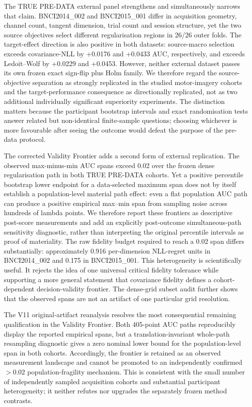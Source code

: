 The TRUE PRE-DATA external panel strengthens and simultaneously narrows that
claim. BNCI2014\_002 and BNCI2015\_001 differ in acquisition geometry,
channel count, tangent dimension, trial count and session structure, yet the
two source objectives select different regularisation regions in 26/26 outer
folds. The target-effect direction is also positive in both datasets:
source-macro selection exceeds covariance-NLL by +0.0176 and +0.0433 AUC,
respectively, and exceeds Ledoit--Wolf by +0.0229 and +0.0453. However,
neither external dataset passes its own frozen exact sign-flip plus Holm
family. We therefore regard the source-objective separation as strongly
replicated in the studied motor-imagery cohorts and the target-performance
consequence as directionally replicated, not as two additional individually
significant superiority experiments. The distinction matters because the
participant bootstrap intervals and exact randomisation tests answer related
but non-identical finite-sample questions; choosing whichever is more
favourable after seeing the outcome would defeat the purpose of the pre-data
protocol.

The corrected Validity Frontier adds a second form of external replication.
The observed max-minus-min AUC spans exceed 0.02 over the frozen dense
regularisation path in both TRUE PRE-DATA cohorts. Yet a positive percentile
bootstrap lower endpoint for a data-selected maximum span does not by itself
establish a population-level material path effect: even a flat population AUC
path can produce a positive empirical max--min span from sampling noise across
hundreds of lambda points. We therefore report these frontiers as descriptive
post-score measurements and add an explicitly post-outcome simultaneous-path
sensitivity diagnostic, rather than interpreting the original percentile
intervals as proof of materiality. The raw fidelity budget required to
reach a 0.02 span differs substantially: approximately 0.916 per-dimension
NLL-regret units in BNCI2014\_002 and 0.175 in BNCI2015\_001. This
heterogeneity is scientifically useful. It rejects the idea of one universal
critical fidelity tolerance while supporting a more general statement that
covariance fidelity defines a cohort-dependent decision-validity frontier.
The dense-grid subset audit further shows that the observed spans are not an
artifact of one particular grid resolution.

The V11 original-artifact reanalysis resolves the most consequential
remaining qualification in the Validity Frontier. Both 405-point AUC
paths reproducibly display the reported empirical spans, but a
translation-invariant whole-path resampling diagnostic gives a zero
nominal lower bound for the population-level span in both cohorts.
Accordingly, the frontier is retained as an observed measurement
landscape and cannot be promoted to an independently confirmed
\(>0.02\) population-fragility mechanism. This is consistent with
the small number of independently sampled acquisition cohorts and
substantial participant heterogeneity; it neither refutes nor upgrades
the separately frozen method contrasts.

